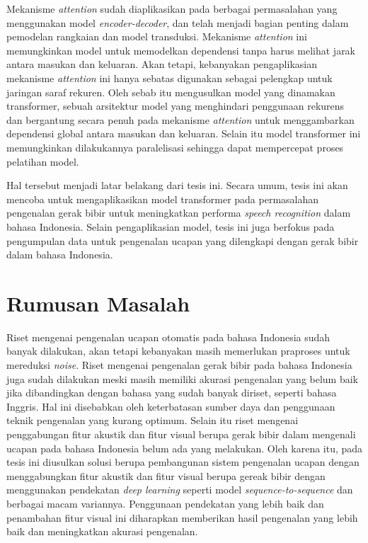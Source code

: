 Mekanisme \textit{attention} sudah diaplikasikan pada berbagai permasalahan yang menggunakan model \textit{encoder-decoder}, dan telah menjadi bagian penting dalam pemodelan rangkaian dan model transduksi. Mekanisme \textit{attention} ini memungkinkan model untuk memodelkan dependensi tanpa harus melihat jarak antara masukan dan keluaran. Akan tetapi, kebanyakan pengaplikasian mekanisme \textit{attention} ini hanya sebatas digunakan sebagai pelengkap untuk jaringan saraf rekuren. Oleh sebab itu \textcite{Vaswani2017} mengusulkan model yang dinamakan transformer, sebuah arsitektur model yang menghindari penggunaan rekurens dan bergantung secara penuh pada mekanisme \textit{attention} untuk menggambarkan dependensi global antara masukan dan keluaran. Selain itu model transformer ini memungkinkan dilakukannya paralelisasi sehingga dapat mempercepat proses pelatihan model.
\bigskip

Hal tersebut menjadi latar belakang dari tesis ini. Secara umum, tesis ini akan mencoba untuk mengaplikasikan model transformer pada permasalahan pengenalan gerak bibir untuk meningkatkan performa \textit{speech recognition} dalam bahasa Indonesia. Selain pengaplikasian model, tesis ini juga berfokus pada pengumpulan data untuk pengenalan ucapan yang dilengkapi dengan gerak bibir dalam bahasa Indonesia.


\section{Rumusan Masalah}

Riset mengenai pengenalan ucapan otomatis pada bahasa Indonesia sudah banyak dilakukan, akan tetapi kebanyakan masih memerlukan praproses untuk mereduksi \textit{noise}. Riset mengenai pengenalan gerak bibir pada bahasa Indonesia juga sudah dilakukan meski masih memiliki akurasi pengenalan yang belum baik jika dibandingkan dengan bahasa yang sudah banyak diriset, seperti bahasa Inggris. Hal ini disebabkan oleh keterbatasan sumber daya dan penggunaan teknik pengenalan yang kurang optimum. Selain itu riset mengenai penggabungan fitur akustik dan fitur visual berupa gerak bibir dalam mengenali ucapan pada bahasa Indonesia belum ada yang melakukan. Oleh karena itu, pada tesis ini diusulkan solusi berupa pembangunan sistem pengenalan ucapan dengan menggabungkan fitur akustik dan fitur visual berupa gereak bibir dengan menggunakan pendekatan \textit{deep learning} seperti model \textit{sequence-to-sequence} dan berbagai macam variannya. Penggunaan pendekatan yang lebih baik dan penambahan fitur visual ini diharapkan memberikan hasil pengenalan yang lebih baik dan meningkatkan akurasi pengenalan.


